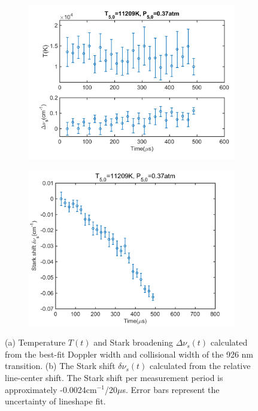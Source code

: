 \documentclass[12pt]{iopart}
\begin{document}
\begin{figure}[h]
  \centering
    \begin{subfigure}[b]{0.45\textwidth}
     \includegraphics[width=\textwidth]{11209K_037atm_T_vs_926.png}
    \caption{\label{fig:Tdoppler}}  
      \end{subfigure} %
    \begin{subfigure}[b]{0.45\textwidth}
     \includegraphics[width=\textwidth]{11209K_037atm_stark_shift_926.png}
      \caption{\label{fig:stark_shift_time_history} }
      \end{subfigure}
    \caption{\label{fig:broadening_and_shift} (a) Temperature $T(t)$ and Stark broadening $\Delta\nu_s(t)$ calculated from the best-fit Doppler width and collisional width of the 926 nm transition. (b) The Stark shift $\delta\nu_s(t)$ calculated from the relative line-center shift. The Stark shift per measurement period is approximately -0.0024cm$^{-1}$/20$\mu$s. Error bars represent the uncertainty of lineshape fit. }
\end{figure}
\end{document}

